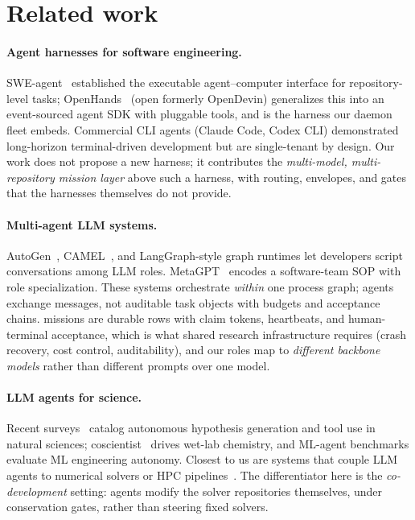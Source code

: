 \section{Related work}\label{sec:related}

\paragraph{Agent harnesses for software engineering.}
SWE-agent~\cite{yang2024sweagent} established the executable
agent--computer interface for repository-level tasks; OpenHands~\cite{wang2024openhands}
(open formerly OpenDevin) generalizes this into an event-sourced agent
SDK with pluggable tools, and is the harness our daemon fleet embeds.
Commercial CLI agents (Claude Code, Codex CLI) demonstrated long-horizon
terminal-driven development but are single-tenant by design. Our work
does not propose a new harness; it contributes the \emph{multi-model,
multi-repository mission layer} above such a harness, with routing,
envelopes, and gates that the harnesses themselves do not provide.

\paragraph{Multi-agent LLM systems.}
AutoGen~\cite{wu2023autogen}, CAMEL~\cite{li2023camel}, and
LangGraph-style graph runtimes let developers script conversations among
LLM roles. MetaGPT~\cite{hong2024metagpt} encodes a software-team SOP
with role specialization. These systems orchestrate \emph{within} one
process graph; agents exchange messages, not auditable task objects with
budgets and acceptance chains. \sysname{} missions are durable rows with
claim tokens, heartbeats, and human-terminal acceptance, which is what
shared research infrastructure requires (crash recovery, cost control,
auditability), and our roles map to \emph{different backbone models}
rather than different prompts over one model.

\paragraph{LLM agents for science.}
Recent surveys~\cite{lu2024aiscientist,baek2024researchagent} catalog
autonomous hypothesis generation and tool use in natural sciences;
coscientist~\cite{boiko2023autonomous} drives wet-lab chemistry, and
ML-agent benchmarks evaluate ML engineering autonomy. Closest to us are
systems that couple LLM agents to numerical solvers or HPC
pipelines~. The
differentiator here is the \emph{co-development} setting: agents modify
the solver repositories themselves, under conservation gates, rather
than steering fixed solvers.

